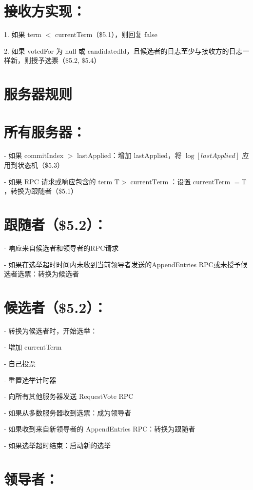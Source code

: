 \documentclass[12pt,a4paper]{report} %
\begin{document}
\section*{接收方实现：}

1. 如果 term $<$ currentTerm（\$5.1），则回复 false

2. 如果 votedFor 为 null 或 candidatedId，且候选者的日志至少与接收方的日志一样新，则授予选票（\$5.2, \$5.4）

\section*{服务器规则}

\section*{所有服务器：}

- 如果 commitIndex $>$ lastApplied：增加 lastApplied，将 $\log [l a s t A p p l i e d]$ 应用到状态机（\$5.3）

- 如果 RPC 请求或响应包含的 term $\mathrm{T}>\operatorname{currentTerm}$：设置 currentTerm $=\mathrm{T}$，转换为跟随者（\$5.1）

\section*{跟随者（\$5.2）：}

- 响应来自候选者和领导者的RPC请求

- 如果在选举超时时间内未收到当前领导者发送的AppendEntries RPC或未授予候选者选票：转换为候选者

\section*{候选者（\$5.2）：}

- 转换为候选者时，开始选举：

- 增加 currentTerm

- 自己投票

- 重置选举计时器

- 向所有其他服务器发送 RequestVote RPC

- 如果从多数服务器收到选票：成为领导者

- 如果收到来自新领导者的 AppendEntries RPC：转换为跟随者

- 如果选举超时结束：启动新的选举

\section*{领导者：}
\end{document}
